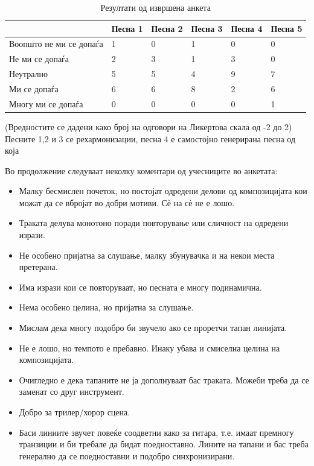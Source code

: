 \begin{table}[H]
    \centering
\begin{tabular}{@{}llllll@{}}
\toprule
   & \multicolumn{1}{c}{Песна 1} & Песна 2 & Песна 3 & Песна 4 & Песна 5 \\ \midrule
Воопшто не ми се допаѓа &  1         &   0      &   1      &   0      &   0      \\
Не ми се допаѓа         &  2         &   3      &   1      &   3      &   0      \\
Неутрално               &  5         &   5      &   4      &   9      &   7      \\
Ми се допаѓа            &  6         &   6      &   8      &   2      &   6      \\
Многу ми се допаѓа      &  0         &   0      &   0      &   0      &   1      \\ \bottomrule
\end{tabular}
    \caption{Резултати од извршена анкета}
    (Вредностите се дадени како број на одговори на Ликертова скала од -2 до 2)
    Песните 1,2 и 3 се рехармонизации, песна 4 е самостојно генерирана песна од која 
    \label{tab:anketa}
\end{table}

Во продолжение следуваат неколку коментари од учесниците во анкетата:
\begin{itemize}
    \item Малку бесмислен почеток, но постојат одредени делови од композицијата кои можат да се вбројат во добри мотиви. Сѐ на сѐ не е лошо.
    \item Траката делува монотоно поради повторување или сличност на одредени изрази.
    \item Не особено пријатна за слушање, малку збунувачка и на некои места претерана.
    \item Има изрази кои се повторуваат, но песната е многу подинамична.
    \item Нема особено целина, но пријатна за слушање.
    \item Мислам дека многу подобро би звучело ако се проретчи тапан линијата.
    \item Не е лошо, но темпото е пребавно. Инаку убава и смиселна целина на композицијата.
    \item Очигледно е дека тапаните не ја дополнуваат бас траката. Можеби треба да се заменат со друг инструмент.
    \item Добро за трилер/хорор сцена.
    \item Баси линиите звучет повеќе соодветни како за гитара, т.е. имаат премногу транзиции и би требале да бидат поедноставно. Лините на тапани и бас треба генерално да се поедноставни и подобро синхронизирани.
\end{itemize}

